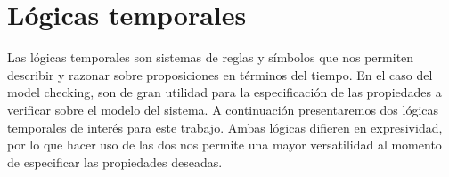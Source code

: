 \documentclass[titlepage, 12pt]{book}
\begin{document}






\section{L\'ogicas temporales}
Las l\'ogicas temporales son sistemas de reglas y s\'imbolos que nos permiten describir y razonar sobre proposiciones en t\'erminos del tiempo. En el caso del model checking, son de gran utilidad para la especificaci\'on de las propiedades a verificar sobre el modelo del sistema. A continuaci\'on presentaremos dos l\'ogicas temporales de inter\'es para este trabajo. Ambas l\'ogicas difieren en expresividad, por lo que hacer uso de las dos nos permite una mayor versatilidad al momento de especificar las propiedades deseadas.\\
\end{document}

